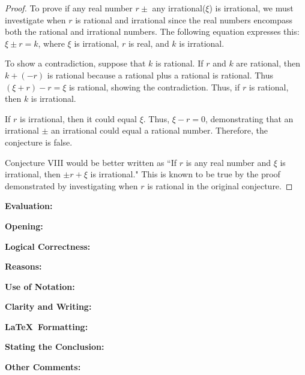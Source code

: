 \documentclass[11pt,titlepage]{article}		%
\def\rubric{\textbf{Evaluation:} \makebox[0.75in]{\hrulefill}

\vspace{.3in}

\textbf{Opening:} \makebox[0.75in]{\hrulefill}

\vspace{.3in}

\textbf{Logical Correctness:} \makebox[0.75in]{\hrulefill}

\vspace{.3in}

\textbf{Reasons:} \makebox[0.75in]{\hrulefill}

\vspace{.3in}

\textbf{Use of Notation:} \makebox[0.75in]{\hrulefill}

\vspace{.3in}

\textbf{Clarity and Writing:} \makebox[0.75in]{\hrulefill}

\vspace{.3in}

\textbf{\LaTeX\ Formatting:} \makebox[0.75in]{\hrulefill}

\vspace{.3in}

\textbf{Stating the Conclusion:} \makebox[0.75in]{\hrulefill}

\vspace{.3in}

\textbf{Other Comments:}

\vspace{1in}

}
\theoremstyle{theorem}
\begin{document}
\begin{proof}
To prove if any real number $r \pm$ any irrational($\xi$) is irrational, we must investigate when $r$ is rational and irrational since the real numbers encompass both the rational and irrational numbers. The following equation expresses this: $\xi \pm r = k$, where $\xi$ is irrational, $r$ is real, and $k$ is irrational.

To show a contradiction, suppose that $k$ is rational. If $r$ and $k$ are rational, then $k +(-r)$ is rational because a rational plus a rational is rational. Thus $(\xi + r) -r = \xi$ is rational, showing the contradiction. Thus, if $r$ is rational, then $k$ is irrational.

If $r$ is irrational, then it could equal $\xi$. Thus, $\xi - r = 0$, demonstrating that an irrational $\pm$ an irrational could equal a rational number. Therefore, the conjecture is false.

Conjecture VIII would be better written as ``If $r$ is any real number and $\xi$ is irrational, then $ \pm r+ \xi$ is irrational." This is known to be true by the proof demonstrated by investigating when $r$ is rational in the original conjecture.

\end{proof}

\clearpage
\rubric
\end{document}
